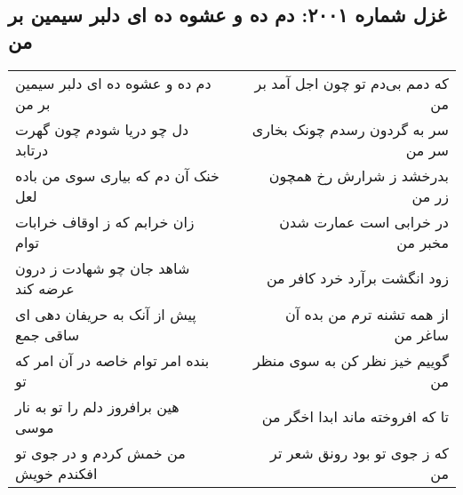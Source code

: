 \begin{center}
\section*{غزل شماره ۲۰۰۱: دم ده و عشوه ده ای دلبر سیمین بر من}
\label{sec:2001}
\begin{longtable}{l p{0.5cm} r}
دم ده و عشوه ده ای دلبر سیمین بر من
&&
که دمم بی‌دم تو چون اجل آمد بر من
\\
دل چو دریا شودم چون گهرت درتابد
&&
سر به گردون رسدم چونک بخاری سر من
\\
خنک آن دم که بیاری سوی من باده لعل
&&
بدرخشد ز شرارش رخ همچون زر من
\\
زان خرابم که ز اوقاف خرابات توام
&&
در خرابی است عمارت شدن مخبر من
\\
شاهد جان چو شهادت ز درون عرضه کند
&&
زود انگشت برآرد خرد کافر من
\\
پیش از آنک به حریفان دهی ای ساقی جمع
&&
از همه تشنه ترم من بده آن ساغر من
\\
بنده امر توام خاصه در آن امر که تو
&&
گوییم خیز نظر کن به سوی منظر من
\\
هین برافروز دلم را تو به نار موسی
&&
تا که افروخته ماند ابدا اخگر من
\\
من خمش کردم و در جوی تو افکندم خویش
&&
که ز جوی تو بود رونق شعر تر من
\\
\end{longtable}
\end{center}
